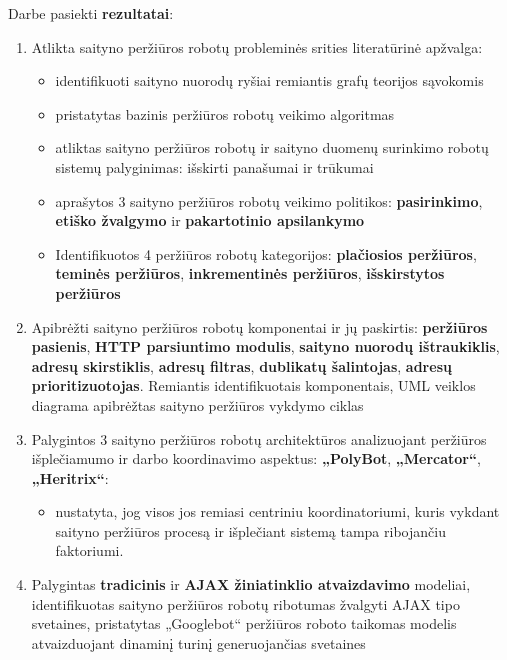 
Darbe pasiekti \textbf{rezultatai}: 

\begin{enumerate}
    \item Atlikta saityno peržiūros robotų probleminės srities literatūrinė apžvalga: 
    \begin{itemize}
        \item identifikuoti saityno nuorodų ryšiai remiantis grafų teorijos sąvokomis
        \item pristatytas bazinis peržiūros robotų veikimo algoritmas
        \item atliktas saityno peržiūros robotų ir saityno duomenų surinkimo robotų sistemų palyginimas: išskirti panašumai ir trūkumai
        \item aprašytos 3 saityno peržiūros robotų veikimo politikos: \textbf{pasirinkimo}, \textbf{etiško žvalgymo} ir \textbf{pakartotinio apsilankymo}
        \item Identifikuotos 4 peržiūros robotų kategorijos: \textbf{plačiosios peržiūros}, \textbf{teminės peržiūros}, \textbf{inkrementinės peržiūros}, \textbf{išskirstytos peržiūros}
    \end{itemize}
    
    \item Apibrėžti saityno peržiūros robotų komponentai ir jų paskirtis: \textbf{peržiūros pasienis}, \textbf{HTTP parsiuntimo modulis}, \textbf{saityno nuorodų ištraukiklis}, \textbf{adresų skirstiklis}, \textbf{adresų filtras}, \textbf{dublikatų šalintojas}, \textbf{adresų prioritizuotojas}. Remiantis identifikuotais komponentais, UML veiklos diagrama apibrėžtas saityno peržiūros vykdymo ciklas
    
    
    \item Palygintos 3 saityno peržiūros robotų architektūros analizuojant peržiūros išplečiamumo ir darbo koordinavimo aspektus: \textbf{„PolyBot}, \textbf{„Mercator“}, \textbf{„Heritrix“}:
    \begin{itemize}
        \item nustatyta, jog visos jos remiasi centriniu koordinatoriumi, kuris vykdant saityno peržiūros procesą ir išplečiant sistemą tampa ribojančiu faktoriumi.
    \end{itemize}
    
    \item Palygintas \textbf{tradicinis} ir \textbf{AJAX žiniatinklio atvaizdavimo} modeliai, identifikuotas saityno peržiūros robotų ribotumas žvalgyti AJAX tipo svetaines, pristatytas „Googlebot“ peržiūros roboto taikomas modelis atvaizduojant dinaminį turinį generuojančias svetaines
    

\end{enumerate}
